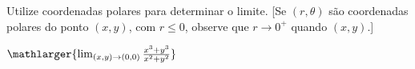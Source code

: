Utilize coordenadas polares para determinar o limite. [Se $(r,\theta)$ são coordenadas polares do ponto $(x,y)$, com $r\leq 0$, observe que $r \rightarrow 0^+$ quando $(x,y)
$.]


$\mathlarger{\lim_{(x,y)\rightarrow(0,0)} \frac{x^3+y^3}{x^2+y^2}}$